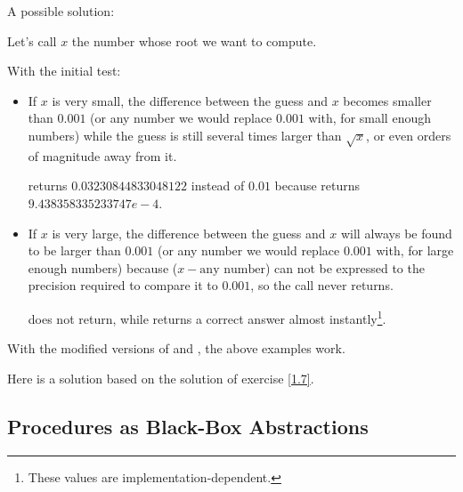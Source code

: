 \begin{exe}[1.7]
    \label{1.7}
    A possible solution:

    Let's call $x$ the number whose root we want to compute.

    With the initial  test:
    \begin{itemize}
        \item If $x$ is very small, the difference between the guess and $x$ 
        becomes smaller than $0.001$ (or any number we would replace $0.001$ 
        with, for small enough numbers) while the guess is still several times 
        larger than $\sqrt{x}$, or even orders of magnitude away from it.
        \begin{example}
             returns $0.03230844833048122$ instead of $0.01$ 
            because\linebreak
            returns\linebreak
            $9.438358335233747e-4$.
        \end{example}
    \item If $x$ is very large, the difference between the guess and $x$ will 
        always be found to be larger than $0.001$ (or any number we would 
        replace $0.001$ with, for large enough numbers) because
        ($x - \text{any number}$) can not be expressed to the precision required 
        to compare it to $0.001$, so the call never returns.
        \begin{example}
             does not return, while  
            returns a correct answer almost instantly\footnote{These values are 
            implementation-dependent.}.
        \end{example}
    \end{itemize}

    With the modified versions of  and , the 
    above examples work.
\end{exe}

\begin{exe}[1.8]
    Here is a solution based on the solution of exercise \ref{1.7}.
\end{exe}

\subsection{Procedures as Black-Box Abstractions}

